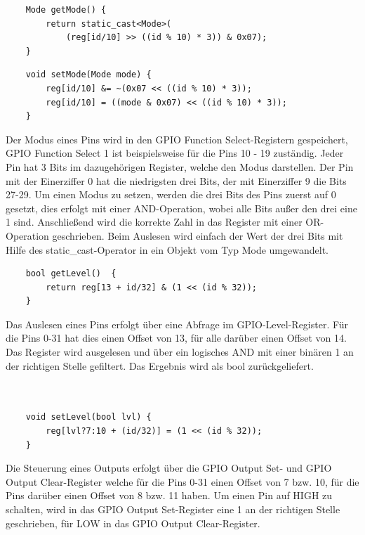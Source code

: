\documentclass[12pt]{article}
\begin{document}
\begin{verbatim}
    Mode getMode() {
        return static_cast<Mode>(
            (reg[id/10] >> ((id % 10) * 3)) & 0x07);
    }
\end{verbatim}
\begin{verbatim}
    void setMode(Mode mode) {
        reg[id/10] &= ~(0x07 << ((id % 10) * 3));
        reg[id/10] = ((mode & 0x07) << ((id % 10) * 3));
    }
\end{verbatim}
Der Modus eines Pins wird in den GPIO Function Select-Registern gespeichert, GPIO Function Select 1 ist beispielsweise für die Pins 10 - 19 zuständig. Jeder Pin hat 3 Bits im dazugehörigen Register, welche den Modus darstellen. Der Pin mit der Einerziffer 0 hat die niedrigsten drei Bits, der mit Einerziffer 9 die Bits 27-29. Um einen Modus zu setzen, werden die drei Bits des Pins zuerst auf 0 gesetzt, dies erfolgt mit einer AND-Operation, wobei alle Bits außer den drei eine 1 sind. Anschließend wird die korrekte Zahl in das Register mit einer OR-Operation geschrieben. Beim Auslesen wird einfach der Wert der drei Bits mit Hilfe des static\_cast-Operator in ein Objekt vom Typ Mode umgewandelt.\\
\begin{verbatim}
    bool getLevel()  {
        return reg[13 + id/32] & (1 << (id % 32));
    }
\end{verbatim}
Das Auslesen eines Pins erfolgt über eine Abfrage im GPIO-Level-Register. Für die Pins 0-31 hat dies einen Offset von 13, für alle darüber einen Offset von 14. Das Register wird ausgelesen und über ein logisches AND mit einer binären 1 an der richtigen Stelle gefiltert. Das Ergebnis wird als bool zurückgeliefert.\\\\\\
\begin{verbatim}
    void setLevel(bool lvl) {
        reg[lvl?7:10 + (id/32)] = (1 << (id % 32));
    }
\end{verbatim}
Die Steuerung eines Outputs erfolgt über die GPIO Output Set- und GPIO Output Clear-Register welche für die Pins 0-31 einen Offset von 7 bzw. 10, für die Pins darüber einen Offset von 8 bzw. 11 haben. Um einen Pin auf HIGH zu schalten, wird in das GPIO Output Set-Register eine 1 an der richtigen Stelle geschrieben, für LOW in das GPIO Output Clear-Register. 
\end{document}
